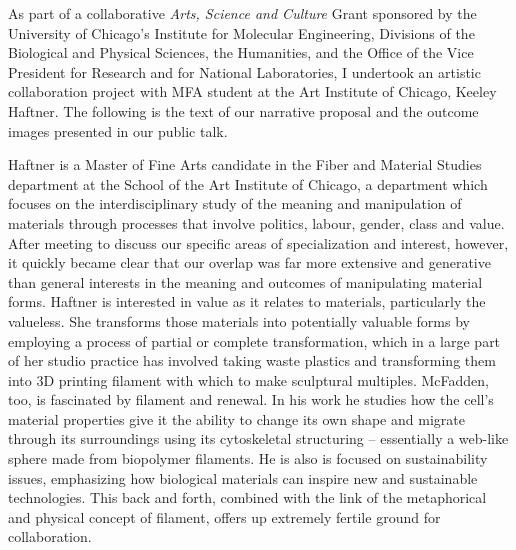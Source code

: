 As part of a collaborative \textit{Arts, Science and Culture} Grant sponsored by the University of Chicago's Institute for Molecular Engineering, Divisions of the Biological and Physical Sciences, the Humanities, and the Office of the Vice President for Research and for National Laboratories, I undertook an artistic collaboration project with MFA student at the Art Institute of Chicago, Keeley Haftner.  The following is the text of our narrative proposal and the outcome images presented in our public talk.

Haftner is a Master of Fine Arts candidate in the Fiber and Material Studies department at the School of the Art Institute of Chicago, a department which focuses on the interdisciplinary study of the meaning and manipulation of materials through processes that involve politics, labour, gender, class and value. After meeting to discuss our specific areas of specialization and interest, however, it quickly became clear that our overlap was far more extensive and generative than general interests in the meaning and outcomes of manipulating material forms. Haftner is interested in value as it relates to materials, particularly the valueless. She transforms those materials into potentially valuable forms by employing a process of partial or complete transformation, which in a large part of her studio practice has involved taking waste plastics and transforming them into 3D printing filament with which to make sculptural multiples. McFadden, too, is fascinated by filament and renewal. In his work he studies how the cell's material properties give it the ability to change its own shape and migrate through its surroundings using its cytoskeletal structuring – essentially a web-like sphere made from biopolymer filaments. He is also is focused on sustainability issues, emphasizing how biological materials can inspire new and sustainable technologies. This back and forth, combined with the link of the metaphorical and physical concept of filament, offers up extremely fertile ground for collaboration.

